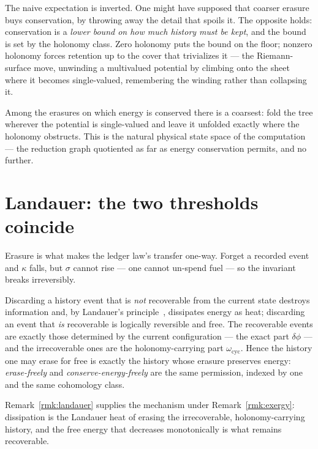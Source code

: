 The naive expectation is inverted.  One might have supposed that coarser
erasure buys conservation, by throwing away the detail that spoils it.
The opposite holds: conservation is a \emph{lower bound on how much
history must be kept}, and the bound is set by the holonomy class.  Zero
holonomy puts the bound on the floor; nonzero holonomy forces retention up
to the cover that trivializes it --- the Riemann-surface move, unwinding a
multivalued potential by climbing onto the sheet where it becomes
single-valued, remembering the winding rather than collapsing it.

\begin{corollary}
\label{cor:maximal}
Among the erasures on which energy is conserved there is a coarsest: fold
the tree wherever the potential is single-valued and leave it unfolded
exactly where the holonomy obstructs.  This is the natural physical state
space of the computation --- the reduction graph quotiented as far as
energy conservation permits, and no further.
\end{corollary}

\section{Landauer: the two thresholds coincide}

Erasure is what makes the ledger law's transfer one-way.  Forget a
recorded event and $\kappa$ falls, but $\sigma$ cannot rise --- one cannot
un-spend fuel --- so the invariant breaks irreversibly.

\begin{remark}
\label{rmk:landauer}
Discarding a history event that is \emph{not} recoverable from the current
state destroys information and, by Landauer's principle~\cite{Landauer},
dissipates energy as heat; discarding an event that \emph{is} recoverable
is logically reversible and free.  The recoverable events are exactly
those determined by the current configuration --- the exact part
$\delta\phi$ --- and the irrecoverable ones are the holonomy-carrying part
$\omega_{\mathrm{cyc}}$.  Hence the history one may erase for free is
exactly the history whose erasure preserves energy: \emph{erase-freely}
and \emph{conserve-energy-freely} are the same permission, indexed by one
and the same cohomology class.
\end{remark}

Remark~\ref{rmk:landauer} supplies the mechanism under
Remark~\ref{rmk:exergy}: dissipation is the Landauer heat of erasing the
irrecoverable, holonomy-carrying history, and the free energy that
decreases monotonically is what remains recoverable.

